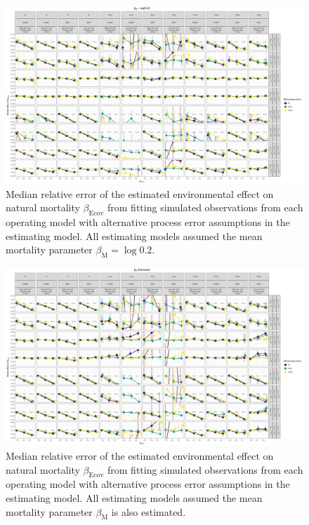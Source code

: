 \documentclass[
  12pt,
]{article}
\begin{document}
\begin{landscape}
\begin{figure}
\caption{Median relative error of the estimated environmental effect on natural mortality $\beta_\text{Ecov}$ from fitting simulated observations from each operating model with alternative process error assumptions in the estimating model. All estimating models assumed the mean mortality parameter $\beta_\text{M} = \log 0.2$.}\label{Ecov_beta_bias_M_fixed}
\begin{center}
\includegraphics[height = \textheight]{Ecov_beta_bias_all_PE_effect_M_fixed.png}
\end{center}
\end{figure}
\end{landscape}

\begin{landscape}
\begin{figure}
\caption{Median relative error of the estimated environmental effect on natural mortality $\beta_\text{Ecov}$ from fitting simulated observations from each operating model with alternative process error assumptions in the estimating model. All estimating models assumed the mean mortality parameter $\beta_\text{M}$ is also estimated.}\label{Ecov_beta_bias_M_estimated}
\begin{center}
\includegraphics[height = \textheight]{Ecov_beta_bias_all_PE_effect_M_estimated.png}
\end{center}
\end{figure}
\end{landscape}
\end{document}
